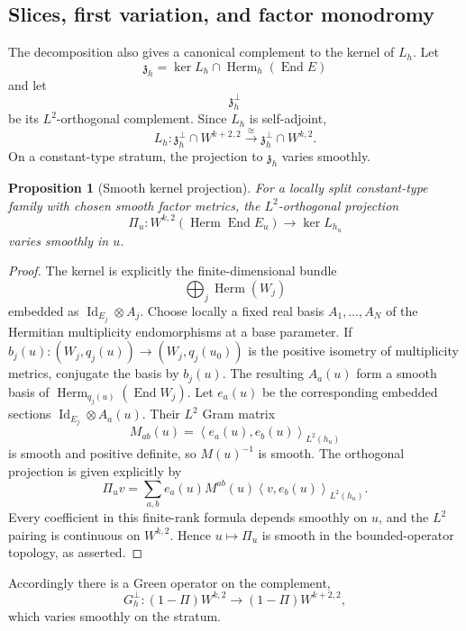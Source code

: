\documentclass[11pt,reqno]{amsart}
\newtheorem{proposition}[theorem]{Proposition}
\theoremstyle{definition}
\theoremstyle{remark}
\newcommand{\End}{\operatorname{End}}
\newcommand{\Herm}{\operatorname{Herm}}
\newcommand{\Id}{\operatorname{Id}}
\newcommand{\ip}[2]{\left\langle #1,#2\right\rangle}
\begin{document}
\subsection{Slices, first variation, and factor monodromy}

The decomposition also gives a canonical complement to the kernel of $L_h$.  Let
\[
  \mathfrak z_h
  =\ker L_h\cap\Herm_h(\End E)
\]
and let
\[
  \mathfrak z_h^\perp
\]
be its $L^2$-orthogonal complement.  Since $L_h$ is self-adjoint,
\begin{equation}\label{eq:L-on-complement}
  L_h:\mathfrak z_h^\perp\cap W^{k+2,2}
  \xrightarrow{\cong}
  \mathfrak z_h^\perp\cap W^{k,2}.
\end{equation}
On a constant-type stratum, the projection to $\mathfrak z_h$ varies smoothly.

\begin{proposition}[Smooth kernel projection]\label{prop:smooth-kernel-projection}
For a locally split constant-type family with chosen smooth factor metrics, the $L^2$-orthogonal projection
\[
  \Pi_u:W^{k,2}(\Herm\End E_u)\to\ker L_{h_u}
\]
varies smoothly in $u$.
\end{proposition}

\begin{proof}
The kernel is explicitly the finite-dimensional bundle
\[
  \bigoplus_j\Herm(W_j)
\]
embedded as $\Id_{E_j}\otimes A_j$.  Choose locally a fixed real basis
$A_1,\ldots,A_N$ of the Hermitian multiplicity endomorphisms at a base
parameter.  If $b_j(u):(W_j,q_j(u))\to(W_j,q_j(u_0))$ is the positive
isometry of multiplicity metrics, conjugate the basis by $b_j(u)$.
The resulting $A_a(u)$ form a smooth basis of
$\Herm_{q_j(u)}(\End W_j)$.  Let $e_a(u)$ be the corresponding embedded
sections $\Id_{E_j}\otimes A_a(u)$.  Their
$L^2$ Gram matrix
\[
  M_{ab}(u)=\ip{e_a(u)}{e_b(u)}_{L^2(h_u)}
\]
is smooth and positive definite, so $M(u)^{-1}$ is smooth.  The
orthogonal projection is given explicitly by
\[
 \Pi_uv=\sum_{a,b}e_a(u)M^{ab}(u)
                  \ip{v}{e_b(u)}_{L^2(h_u)}.
\]
Every coefficient in this finite-rank formula depends smoothly on $u$,
and the $L^2$ pairing is continuous on $W^{k,2}$.  Hence $u\mapsto
\Pi_u$ is smooth in the bounded-operator topology, as asserted.
\end{proof}

Accordingly there is a Green operator on the complement,
\begin{equation}\label{eq:reduced-green}
  G_h^\perp:
  (1-\Pi)W^{k,2}\to(1-\Pi)W^{k+2,2},
\end{equation}
which varies smoothly on the stratum.
\end{document}
